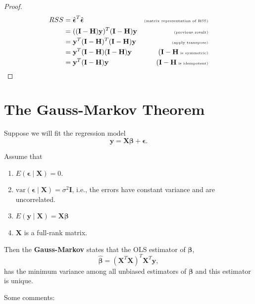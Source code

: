 \documentclass[
]{book}
\providecommand{\tightlist}{%
  \setlength{\itemsep}{0pt}\setlength{\parskip}{0pt}}
\theoremstyle{definition}
\theoremstyle{definition}
\theoremstyle{definition}
\theoremstyle{definition}
\theoremstyle{remark}
\begin{document}
\begin{proof}
\[
\begin{aligned}
RSS &= \hat{\boldsymbol{\epsilon}}^T\hat{\boldsymbol{\epsilon}}&\tiny\text{(matrix representation of RSS)}\\
&=((\mathbf{I}-\mathbf{H})\mathbf{y})^T(\mathbf{I}-\mathbf{H})\mathbf{y}&\tiny\text{(previous result)}\\
&=\mathbf{y}^T(\mathbf{I}-\mathbf{H})^T(\mathbf{I}-\mathbf{H})\mathbf{y}&\tiny\text{(apply transpose)}\\
&=\mathbf{y}^T(\mathbf{I}-\mathbf{H})(\mathbf{I}-\mathbf{H})\mathbf{y}&\tiny(\mathbf{I}-\mathbf{H} \text{ is symmetric)}\\
&=\mathbf{y}^T(\mathbf{I}-\mathbf{H})\mathbf{y}&\tiny(\mathbf{I}-\mathbf{H} \text{ is idempotent)}\\
\end{aligned}
\]
\end{proof}

\hypertarget{the-gauss-markov-theorem}{%
\section{The Gauss-Markov Theorem}\label{the-gauss-markov-theorem}}

Suppose we will fit the regression model
\[
\mathbf{y}=\mathbf{X}\boldsymbol{\beta} + \boldsymbol{\epsilon}.
\]

Assume that

\begin{enumerate}
\def\labelenumi{\arabic{enumi}.}
\tightlist
\item
  \(E(\boldsymbol{\epsilon}\mid \mathbf{X}) = 0\).
\item
  \(\mathrm{var}(\boldsymbol{\epsilon}\mid \mathbf{X}) = \sigma^2 \mathbf{I}\), i.e., the errors have constant variance and are uncorrelated.
\item
  \(E(\mathbf{y}\mid \mathbf{X})=\mathbf{X}\boldsymbol{\beta}\)
\item
  \(\mathbf{X}\) is a full-rank matrix.
\end{enumerate}

Then the \textbf{Gauss-Markov} states that the OLS estimator of \(\boldsymbol{\beta}\),
\[
\hat{\boldsymbol{\beta}}=(\mathbf{X}^T\mathbf{X})^T\mathbf{X}^T\mathbf{y},
\]
has the minimum variance among all unbiased estimators of \(\boldsymbol{\beta}\) and this estimator is unique.

Some comments:
\end{document}
